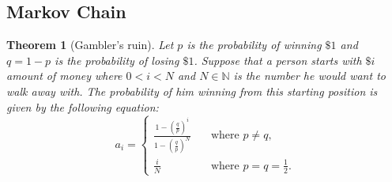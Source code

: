 \documentclass[10pt]{article}
\theoremstyle{remark}
\theoremstyle{plain}
\newtheorem{Theorem}{Theorem}[section]
\newcommand{\N}{\mathbb{N}}
\numberwithin{equation}{section}
\begin{document}
\subsection{Markov Chain}
\begin{Theorem}[Gambler's ruin]\label{gambler_ruin}
Let $p$ is the probability of winning $\$1$ and $q = 1 - p$ is the probability of losing $\$1$. Suppose that a person starts with $\$i$ amount of money where $0 < i < N$ and $N \in \N$ is the number he would want to walk away with. The probability of him winning from this starting position is given by the following equation:
	\[ a_i =
		\begin{cases}
			\frac{1-\left(\frac{q}{p}\right)^i}{1 - \left(\frac{q}{p}\right)^N} \quad & \text{where } p \neq q,\\
			\frac{i}{N}  &  \text{where } p = q = \frac{1}{2}.
		\end{cases}
	\]
\end{Theorem}
\end{document}
